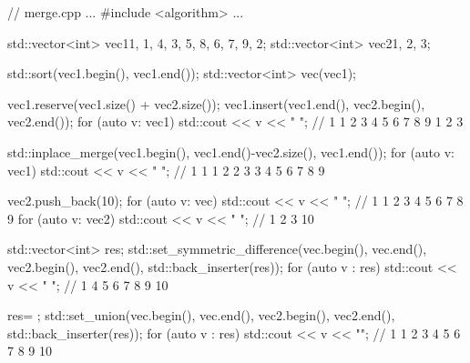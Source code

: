 \begin{cpp}
// merge.cpp
...
#include <algorithm>
...

std::vector<int> vec1{1, 1, 4, 3, 5, 8, 6, 7, 9, 2};
std::vector<int> vec2{1, 2, 3};

std::sort(vec1.begin(), vec1.end());
std::vector<int> vec(vec1);

vec1.reserve(vec1.size() + vec2.size());
vec1.insert(vec1.end(), vec2.begin(), vec2.end());
for (auto v: vec1) std::cout << v << " "; // 1 1 2 3 4 5 6 7 8 9 1 2 3

std::inplace_merge(vec1.begin(), vec1.end()-vec2.size(), vec1.end());
for (auto v: vec1) std::cout << v << " "; // 1 1 1 2 2 3 3 4 5 6 7 8 9

vec2.push_back(10);
for (auto v: vec) std::cout << v << " "; // 1 1 2 3 4 5 6 7 8 9
for (auto v: vec2) std::cout << v << " "; // 1 2 3 10

std::vector<int> res;
std::set_symmetric_difference(vec.begin(), vec.end(), vec2.begin(), vec2.end(),
							  std::back_inserter(res));
for (auto v : res) std::cout << v << " "; // 1 4 5 6 7 8 9 10

res= {};
std::set_union(vec.begin(), vec.end(), vec2.begin(), vec2.end(),
std::back_inserter(res));
for (auto v : res) std::cout << v << ""; // 1 1 2 3 4 5 6 7 8 9 10
\end{cpp}





















